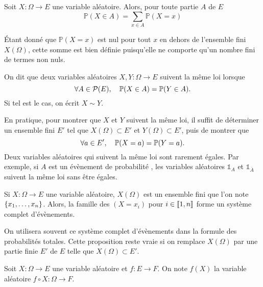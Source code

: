 \documentclass{magnolia}
\begin{document}
  
\begin{proposition}
Soit $X:\Omega\to E$ une variable aléatoire. Alors, pour toute partie $A$ de $E$
  \[\mathbb{P}(X\in A)=\sum_{x\in A} \mathbb{P}(X=x)\]
\end{proposition}

\begin{remarqueUnique}
\remarque Étant donné que $\mathbb{P}(X=x)$ est nul pour tout $x$ en dehors de l'ensemble
  fini $X(\Omega)$, cette somme est bien définie puisqu'elle ne comporte qu'un nombre fini
  de termes non nuls.
\end{remarqueUnique}


\begin{definition}
On dit que deux variables aléatoires $X,Y:\Omega\to E$ suivent la même
loi lorsque
\[\forall A\in\mathcal{P}(E),\quad \mathbb{P}(X\in A)=\mathbb{P}(Y\in A).\]
Si tel est le cas, on écrit $X\sim Y$.
\end{definition}

\begin{remarques}
\remarque En pratique, pour montrer que $X$ et $Y$ suivent la même loi, il suffit de déterminer
  un ensemble fini $E'$ tel que $X(\Omega)\subset E'$ et $Y(\Omega)\subset E'$, puis de
  montrer que
  \[\forall a\in E',\quad \mathbb{P}(X=a)=\mathbb{P}(Y=a).\]
\remarque Deux variables aléatoires qui suivent la même loi sont rarement égales.
  Par exemple, si $A$ est un évènement de probabilité , les variables
  aléatoires $\mathds{1}_A$ et $\mathds{1}_{\bar{A}}$ suivent la même loi sans être
  égales.
\end{remarques}

\begin{proposition}
Si $X:\Omega\to E$ une variable aléatoire, $X(\Omega)$ est un ensemble fini que l'on
note $\left\{x_1,\ldots,x_n\right\}$. Alors, la famille des $(X=x_i)$ pour $i\in\left\llbracket 1,n\right\rrbracket$ forme
un système complet d'évènements.
\end{proposition}

\begin{remarques}
\remarque On utilisera souvent ce système complet d'évènements dans la formule des
  probabilités totales.
\remarque Cette proposition reste vraie si on remplace $X(\Omega)$ par une partie finie
  $E'$ de $E$ telle que $X(\Omega)\subset E'$.
\end{remarques}


\begin{definition}
Soit $X:\Omega\to E$ une variable aléatoire et $f:E\to F$. On note $f(X)$ la variable
aléatoire $f\circ X:\Omega\to F$.
\end{definition}
\end{document}
